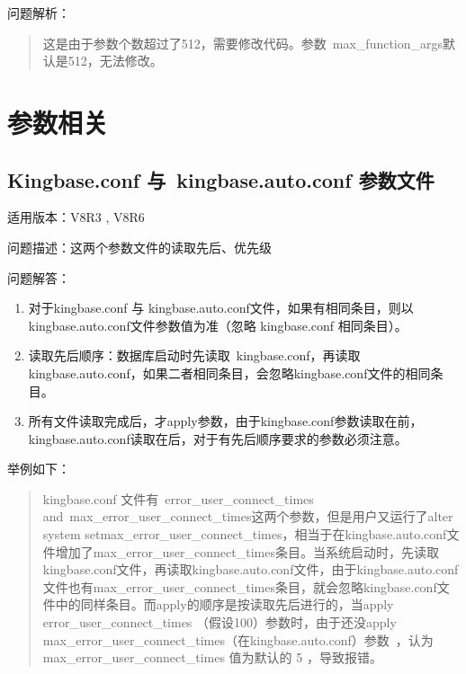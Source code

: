 \documentclass[a4,10pt,oneside,english]{sphinxmanual}
\begin{document}
问题解析：
\begin{quote}

这是由于参数个数超过了512，需要修改代码。参数 max\_function\_args默认是512，无法修改。
\end{quote}


\chapter{参数相关}
\label{\detokenize{parameter:id1}}\label{\detokenize{parameter::doc}}

\section{Kingbase.conf 与 kingbase.auto.conf 参数文件}
\label{\detokenize{parameter:kingbase-conf-kingbase-auto-conf}}
适用版本：V8R3 , V8R6

问题描述：这两个参数文件的读取先后、优先级

问题解答：
\begin{enumerate}
%
\item {} 
对于kingbase.conf 与 kingbase.auto.conf文件，如果有相同条目，则以kingbase.auto.conf文件参数值为准（忽略 kingbase.conf 相同条目）。

\item {} 
读取先后顺序：数据库启动时先读取 kingbase.conf，再读取kingbase.auto.conf，如果二者相同条目，会忽略kingbase.conf文件的相同条目。

\item {} 
所有文件读取完成后，才apply参数，由于kingbase.conf参数读取在前，kingbase.auto.conf读取在后，对于有先后顺序要求的参数必须注意。

\end{enumerate}

举例如下：
\begin{quote}

kingbase.conf 文件有 error\_user\_connect\_times and max\_error\_user\_connect\_times这两个参数，但是用户又运行了alter system setmax\_error\_user\_connect\_times，相当于在kingbase.auto.conf文件增加了max\_error\_user\_connect\_times条目。当系统启动时，先读取kingbase.conf文件，再读取kingbase.auto.conf文件，由于kingbase.auto.conf文件也有max\_error\_user\_connect\_times条目，就会忽略kingbase.conf文件中的同样条目。而apply的顺序是按读取先后进行的，当apply error\_user\_connect\_times （假设100）参数时，由于还没apply max\_error\_user\_connect\_times（在kingbase.auto.conf）参数 ，认为 max\_error\_user\_connect\_times 值为默认的 5 ，导致报错。
\end{quote}
\end{document}
